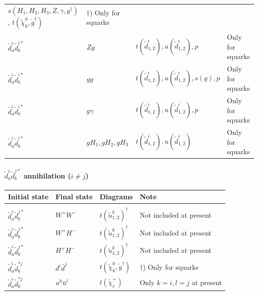\documentclass[a4paper,10pt,oneside]{book}
\newcommand{\tabspace}{\\[-2.5ex]}
\begin{document}
{\begin{center}
\begin{tabular}{llll}
$s(H_{1},H_{2},H_{3},Z,\gamma,g^\dagger)$, $t(\tilde{\chi}_{k}^0,\tilde{g}^\dagger)$
& $\dagger$) Only for squarks\\ 
$\tilde{d}^i_a\tilde{d}^{i*}_b$ & $Z g$ & $t(\tilde{d}^i_{1,2}), u(\tilde{d}^i_{1,2}), p$
& Only for squarks\\
$\tilde{d}^i_a\tilde{d}^{i*}_b$ & $g g$ & $t(\tilde{d}^i_{1,2}), u(\tilde{d}^i_{1,2}), s(g), p$
& Only for squarks\\
$\tilde{d}^i_a\tilde{d}^{i*}_b$ & $g \gamma$ & $t(\tilde{d}^i_{1,2}), u(\tilde{d}^i_{1,2}), p$
& Only for squarks\\
$\tilde{d}^i_a\tilde{d}^{i*}_b$ & $g H_1, g H_2, g H_3$ & 
$t(\tilde{d}^i_{1,2}), u(\tilde{d}^i_{1,2})$
& Only for squarks\\ \hline
\end{tabular}
\end{center}
}

\paragraph{$\tilde{d}^i_{a}\tilde{d}_{b}^{j*}$ annihilation ($i \ne j$)}

\begin{center}
\begin{tabular}{llll} \hline
{\bfseries Initial state} & {\bfseries Final state} &
{\bfseries Diagrams} & {\bfseries Note} \\ \hline \tabspace
$\tilde{d}^i_a\tilde{d}^{j*}_b$ & $W^+W^-$ &
$t(\tilde{u}^k_{1,2})^\dagger$ & Not included at present \\
$\tilde{d}^i_a\tilde{d}^{j*}_b$ & $W^+ H^-$ &
$t(\tilde{u}^k_{1,2})^\dagger$ & Not included at present \\
$\tilde{d}^i_a\tilde{d}^{j*}_b$ & $H^+ H^-$ &
$t(\tilde{u}^k_{1,2})^\dagger$ & Not included at present\\
$\tilde{d}^i_a\tilde{d}^{*j}_b$ & $d^i \bar{d}^j$ &
$t(\tilde{\chi}_{k}^0, \tilde{g}^\dagger)$ & $\dagger$) Only for squarks\\ 
$\tilde{d}^i_a\tilde{d}^{*j}_b$ & $u^k \bar{u}^l$ &
$t(\tilde{\chi}_{c}^+)$ & Only $k=i,l=j$ at present\\ 

\hline
\end{tabular}
\end{center}

\end{document}
